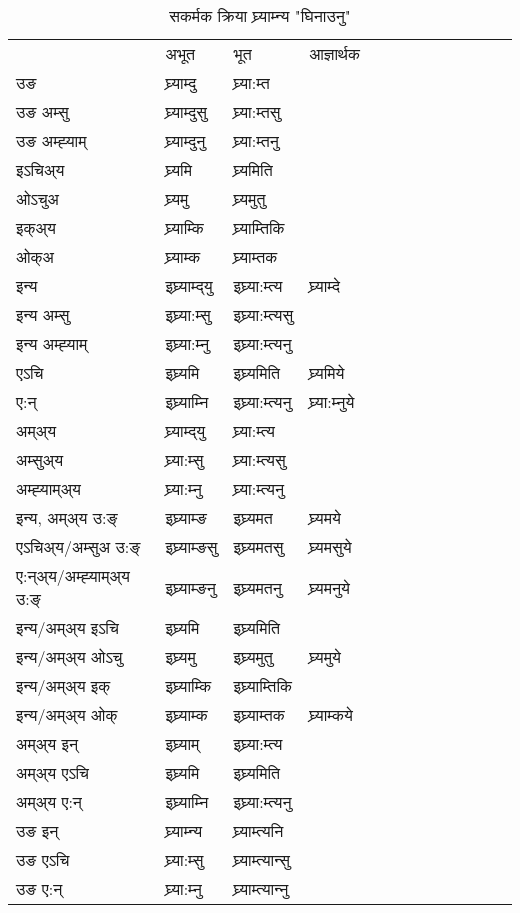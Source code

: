 \begin{table}[H]
\label{ɛmt.vt} \centering
\caption{सकर्मक क्रिया  घ्र्याम्‍न्य  "घिनाउनु"  }
\begin{tabular}{l|l|l|l|l|l|l|l|l|l|l|l|l}  \toprule
&अभूत & भूत & आज्ञार्थक \\ 
उङ &घ्र्याम्दु &घ्र्या:म्त \\ 
उङ अम्सु&घ्र्याम्दुसु &घ्र्या:म्तसु \\ 
उङ अम्ह्‍याम्&घ्र्याम्दुनु &घ्र्या:म्तनु \\ 
इऽचिअ्य &घ्र्यमि &घ्र्यमिति   \\ 
ओऽचुअ        &घ्र्यमु &घ्र्यमुतु   \\ 
इक्अ्य&घ्र्याम्कि &घ्र्याम्तिकि   \\ 
ओक्अ &घ्र्याम्क &घ्र्याम्तक   \\ 
इन्य & इघ्र्याम्द्‌यु  & इघ्र्या:म्त्य &घ्र्याम्दे  \\ 
इन्य अम्सु& इघ्र्या:म्सु  & इघ्र्या:म्त्यसु   \\ 
इन्य अम्ह्‍याम्& इघ्र्या:म्‍नु  & इघ्र्या:म्त्यनु   \\ 
एऽचि & इघ्र्यमि & इघ्र्यमिति &घ्र्यमिये    \\ 
ए:न् & इघ्र्याम्‍नि  & इघ्र्या:म्त्यनु &घ्र्या:म्‍नुये  \\ 
अम्अ्य & घ्र्याम्द्‌यु  & घ्र्या:म्त्य  \\ 
अम्सुअ्य & घ्र्या:म्सु & घ्र्या:म्त्यसु  \\ 
अम्ह्‍याम्अ्य & घ्र्या:म्‍नु  & घ्र्या:म्त्यनु \\ 
\midrule
इन्य, अम्अ्य उ:ङ्‌ &इघ्र्याम्ङ &इघ्र्यमत &घ्र्यमये \\ 
एऽचिअ्य/अम्सुअ उ:ङ्‌ &इघ्र्याम्ङसु &इघ्र्यमतसु &घ्र्यमसुये \\ 
ए:न्अ्य/अम्ह्‍याम्अ्य उ:ङ्‌ &इघ्र्याम्ङनु &इघ्र्यमतनु &घ्र्यमनुये \\ 
इन्य/अम्अ्य इऽचि &इघ्र्यमि &इघ्र्यमिति    \\ 
इन्य/अम्अ्य ओऽचु &इघ्र्यमु &इघ्र्यमुतु  &घ्र्यमुये  \\ 
इन्य/अम्अ्य इक् &इघ्र्याम्कि &इघ्र्याम्तिकि   \\ 
इन्य/अम्अ्य ओक् &इघ्र्याम्क &इघ्र्याम्तक  &घ्र्याम्कये  \\ 
अम्अ्य इन् & इघ्र्याम् & इघ्र्या:म्त्य   \\ 
अम्अ्य एऽचि & इघ्र्यमि & इघ्र्यमिति    \\ 
अम्अ्य ए:न् & इघ्र्याम्‍नि  & इघ्र्या:म्त्यनु  \\ 
\midrule
उङ इन् & घ्र्याम्‍न्य  & घ्र्याम्त्यनि  \\ 
उङ एऽचि & घ्र्या:म्सु  & घ्र्याम्त्यान्सु   \\ 
उङ ए:न्& घ्र्या:म्‍नु  & घ्र्याम्त्यान्‍नु   \\ 
\bottomrule
\end{tabular}
\end{table}


